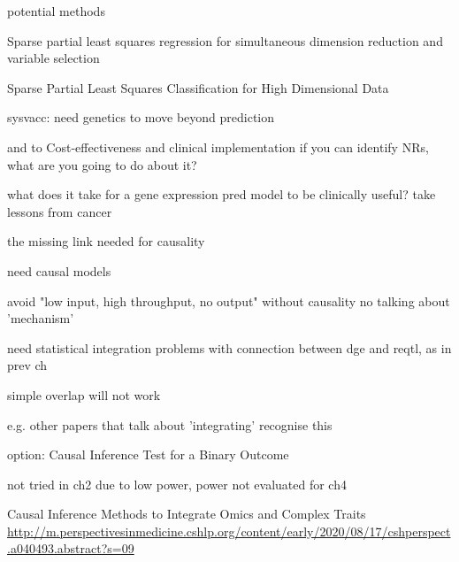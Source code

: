 \begin{outline}

        potential methods

            Sparse partial least squares regression for simultaneous dimension reduction and variable selection

             Sparse Partial Least Squares Classification for High Dimensional Data 

        sysvacc: need genetics to move beyond prediction

    and to Cost-effectiveness and clinical implementation
        if you can identify NRs, what are you going to do about it?

        what does it take for a gene expression pred model to be clinically useful?
            take lessons from cancer

the missing link needed for causality

    need causal models

        avoid "low input, high throughput, no output"
        without causality no talking about 'mechanism'

    need statistical integration
        problems with connection between dge and reqtl, as in prev ch

        simple overlap will not work

            e.g. other papers that talk about 'integrating' recognise this

    option:
        Causal Inference Test for a Binary Outcome

            not tried in ch2 due to low power, power not evaluated for ch4

            Causal Inference Methods to Integrate Omics and Complex Traits
            \url{http://m.perspectivesinmedicine.cshlp.org/content/early/2020/08/17/cshperspect.a040493.abstract?s=09}


\end{outline}
